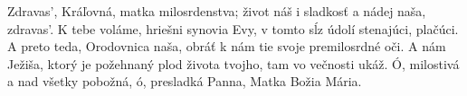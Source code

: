 Zdravas’, Kráľovná, matka milosrdenstva;
život náš i sladkosť a nádej naša, zdravas’.
K tebe voláme, hriešni synovia Evy,
v tomto sĺz údolí stenajúci, plačúci.
\versseparator
A preto teda, Orodovnica naša,
obráť k nám tie svoje premilosrdné oči.
A nám Ježiša, ktorý je požehnaný
plod života tvojho, tam vo večnosti ukáž.
\versseparator
Ó, milostivá a nad všetky pobožná,
ó, presladká Panna, Matka Božia Mária.
